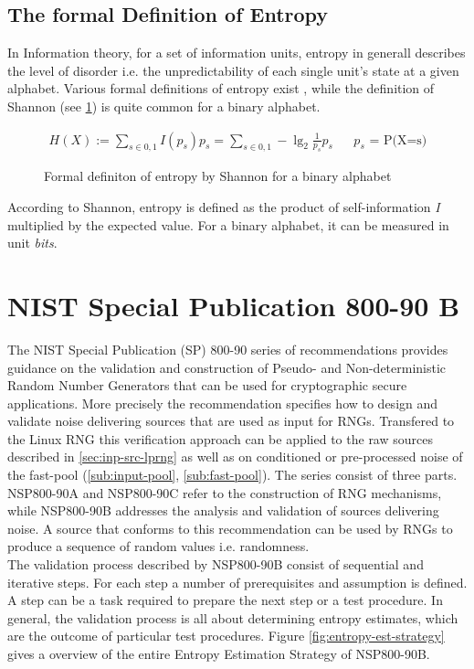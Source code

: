 \subsection{The formal Definition of Entropy}
In Information theory, for a set of information units, entropy in generall describes the level of disorder i.e. the unpredictability of each single unit's state at a given alphabet. Various formal definitions of entropy exist \cite{hagerty2012entropy}, while the definition of Shannon (see \ref{fig:form-entropy-shan}) is quite common for a binary alphabet. 

\begin{figure}[H]
	\begin{align*}
	\displaystyle H(X) := \sum_{s \in {0,1}} I(p_s) p_s = \sum_{s \in {0,1}} -\lg_2 \frac{1}{p_s} p_s && \text{$p_s$ = P(X=s)}
	\end{align*}
	\caption{Formal definiton of entropy by Shannon for a binary alphabet}
	\label{fig:form-entropy-shan}
\end{figure}
According to Shannon, entropy is defined as the product of self-information \textit{I} multiplied by the expected value. For a binary alphabet, it can be measured in unit \textit{bits}. 



\section{NIST Special Publication 800-90 B}

The NIST Special Publication (SP) 800-90 series of recommendations provides 
guidance on the validation and construction of Pseudo- and Non-deterministic Random Number Generators that can be used for cryptographic secure applications. More precisely the recommendation specifies how to design and validate noise delivering sources that are used as input for RNGs. Transfered to the Linux RNG this verification approach can be applied to the raw sources described in \ref{sec:inp-src-lprng} as well as on conditioned or pre-processed noise of the fast-pool (\ref{sub:input-pool}, \ref{sub:fast-pool}). The series consist of three parts. NSP800-90A and NSP800-90C refer to the construction of RNG mechanisms, while NSP800-90B addresses the analysis and validation of sources delivering noise. A source that conforms to this recommendation can be used by RNGs to produce a sequence of random values \cite{rukhin2010nist} i.e. randomness.\\
The validation process described by NSP800-90B consist of sequential and iterative steps. For each step a number of prerequisites and assumption is defined. A step can be a task required to prepare the next step or a test procedure. In general, the validation process is all about determining entropy estimates, which are the outcome of particular test procedures. Figure \ref{fig:entropy-est-strategy} gives a overview of the entire Entropy Estimation Strategy of NSP800-90B.

